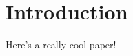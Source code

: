 \chapter{Introduction}
\label{ch:intro}


Here's a really cool paper!~\cite{strowes:2011:reallycool}




